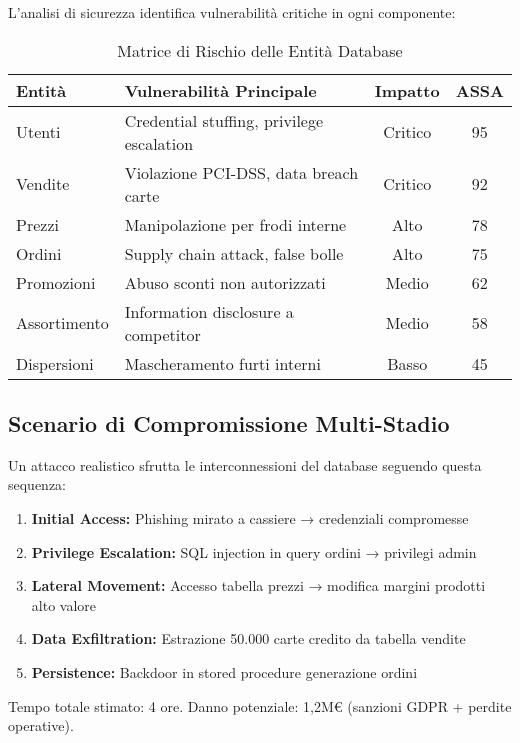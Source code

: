 L'analisi di sicurezza identifica vulnerabilità critiche in ogni componente:

\begin{table}[htbp]
\centering
\caption{Matrice di Rischio delle Entità Database}
\label{tab:risk_matrix}
\begin{tabular}{llcc}
\toprule
\textbf{Entità} & \textbf{Vulnerabilità Principale} & \textbf{Impatto} & \textbf{ASSA} \\
\midrule
Utenti & Credential stuffing, privilege escalation & Critico & 95 \\
Vendite & Violazione PCI-DSS, data breach carte & Critico & 92 \\
Prezzi & Manipolazione per frodi interne & Alto & 78 \\
Ordini & Supply chain attack, false bolle & Alto & 75 \\
Promozioni & Abuso sconti non autorizzati & Medio & 62 \\
Assortimento & Information disclosure a competitor & Medio & 58 \\
Dispersioni & Mascheramento furti interni & Basso & 45 \\
\bottomrule
\end{tabular}
\end{table}

\subsection{Scenario di Compromissione Multi-Stadio}
\label{subsec:scenario_attacco}

Un attacco realistico sfrutta le interconnessioni del database seguendo questa sequenza:

\begin{enumerate}
\item \textbf{Initial Access:} Phishing mirato a cassiere → credenziali compromesse
\item \textbf{Privilege Escalation:} SQL injection in query ordini → privilegi admin
\item \textbf{Lateral Movement:} Accesso tabella prezzi → modifica margini prodotti alto valore
\item \textbf{Data Exfiltration:} Estrazione 50.000 carte credito da tabella vendite
\item \textbf{Persistence:} Backdoor in stored procedure generazione ordini
\end{enumerate}

Tempo totale stimato: 4 ore. Danno potenziale: 1,2M€ (sanzioni GDPR + perdite operative).

